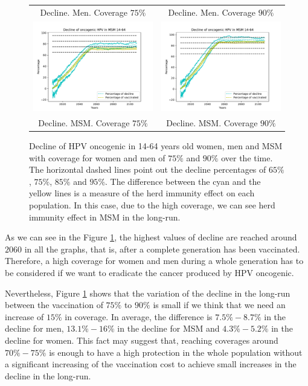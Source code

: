 \begin{figure}[!]
\begin{tabular}{cc}
		Decline. Men. Coverage $75\%$	& Decline. Men. Coverage $90\%$ \\ 		
		\includegraphics[width=0.5\linewidth]{IMGs/9.-Erradicacion_ONCO/onco_MSM_75.pdf}	& 
		\includegraphics[width=0.5\linewidth]{IMGs/9.-Erradicacion_ONCO/onco_MSM_90.pdf}  \\ 
		Decline. MSM. Coverage $75\%$	& Decline. MSM. Coverage $90\%$
	\end{tabular} 
	\caption{Decline of HPV oncogenic in 14-64 years old women, men and MSM with coverage for women and men of $75\%$ and $90\%$ over the time. The horizontal dashed lines point out the decline percentages of $65\%$, $75\%$, $85\%$ and $95\%$. The difference between the cyan and the yellow lines is a measure of the herd immunity effect on each population. In this case, due to the high coverage, we can see herd immunity effect in MSM in the long-run.}
	\label{fig:erradicacion}
\end{figure}

As we can see in the Figure \ref{fig:erradicacion}, the highest values of decline are reached around $2060$ in all the graphs, that is, after a complete generation has been vaccinated. Therefore, a high coverage for women and men during a whole generation has to be considered if we want to eradicate the cancer produced by HPV oncogenic. 

Nevertheless, Figure \ref{fig:erradicacion} shows that the variation of the decline in the long-run between the vaccination of $75\%$ to $90\%$ is small if we think that we need an increase of $15\%$ in coverage. In average, the difference is $7.5\% - 8.7\%$ in the decline for men, $13.1\%-16\%$ in the decline for MSM and $4.3\%-5.2\%$ in the decline for women. This fact may suggest that, reaching coverages around $70\% - 75\%$ is enough to have a high protection in the whole population without a significant increasing of the vaccination cost to achieve small increases in the decline in the long-run.

